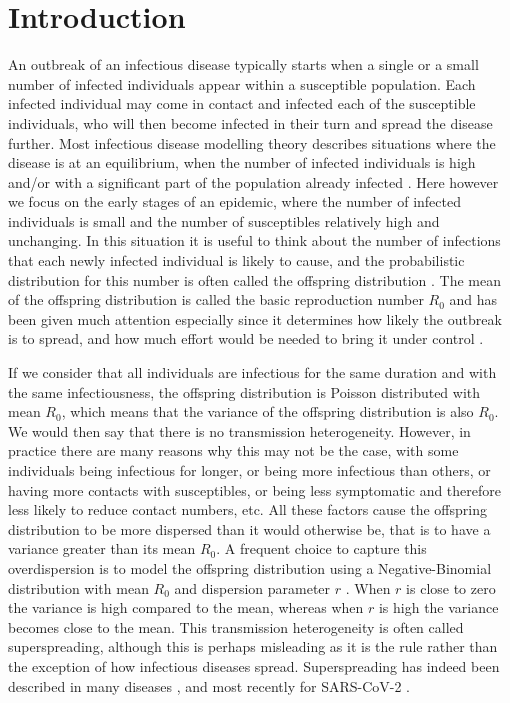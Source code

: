 \documentclass{article}
\begin{document}
\newpage
\section{Introduction}

An outbreak of an infectious disease typically starts when a single or a small number
of infected individuals appear within a susceptible population. Each infected individual
may come in contact and infected each of the susceptible individuals, who will then
become infected in their turn and spread the disease further. Most infectious disease
modelling theory describes situations where the disease is at an equilibrium, when the number
of infected individuals is high and/or with a significant part of the population already infected
\citep{Anderson1991,keeling2008modeling}. 
Here however we focus on the early stages of an epidemic, where the number of 
infected individuals is small and the number of susceptibles relatively high and unchanging.
In this situation it is useful to think about the number of infections that each newly infected
individual is likely to cause, and the probabilistic distribution for this number is often called
the offspring distribution \citep{Grassly2008}. 
The mean of the offspring distribution is called the basic
reproduction number $R_0$ and has been given much attention especially since
it determines how likely the outbreak is to spread, and how much effort would be needed
to bring it under control \citep{fraserFactorsThatMake2004,fergusonStrategiesMitigatingInfluenza2006}. 

If we consider that all
individuals are infectious for the same duration and with the same infectiousness,
the offspring distribution is Poisson distributed with mean $R_0$, which means that the variance
of the offspring distribution is also $R_0$. We would then say that there is no transmission
heterogeneity. However, in practice there are many reasons why this may not be the case,
with some individuals being infectious for longer, or being more infectious than others, or 
having more contacts with susceptibles, or being less symptomatic and therefore less likely
to reduce contact numbers, etc. All these factors cause the offspring distribution to be more 
dispersed than it would otherwise be, that is to have a variance greater than its mean $R_0$. 
A frequent choice to capture this overdispersion is to model the offspring distribution
using a Negative-Binomial distribution with mean $R_0$ and dispersion parameter $r$
\citep{Lloyd-Smith2005,Grassly2008}. When $r$ is close to zero the variance is high compared to the mean,
whereas when $r$ is high the variance becomes close to the mean. This transmission heterogeneity
is often called superspreading, although this is perhaps misleading
as it is the rule rather than the exception of how infectious diseases spread. Superspreading has
indeed been described in many diseases \citep{woolhouseHeterogeneitiesTransmissionInfectious1997,
steinSuperspreadersInfectiousDiseases2011,kucharskiRoleSuperspreadingMiddle2015,
wangSuperspreadingHeterogeneityTransmission2021}, 
and most recently for 
SARS-CoV-2 \citep{Wang2020,lemieuxPhylogeneticAnalysisSARSCoV22021,gomez-carballaSuperspreadingEmergenceCOVID192021,duSystematicReviewMetaanalyses2022}.
\end{document}

